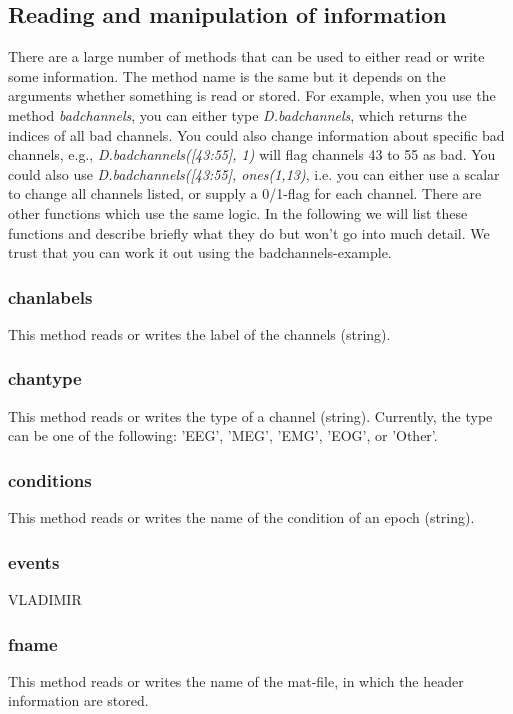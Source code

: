 \subsection{Reading and manipulation of information}
There are a large number of methods that can be used to either read or
write some information. The method name is the same but it depends on
the arguments whether something is read or stored. For example, when
you use the method \textit{badchannels}, you can either type
\textit{D.badchannels}, which returns the indices of all bad channels. You
could also change information about specific bad channels, e.g.,
\textit{D.badchannels([43:55], 1)} will flag channels 43 to 55 as
bad. You 
  could also use \textit{D.badchannels([43:55], ones(1,13)}, i.e. you
  can 
  either use a scalar to change all channels listed, or supply a
  0/1-flag for each channel. There are other functions which use the
  same logic. In the following we will list these functions and
  describe briefly what they do but won't go into much detail. We
  trust that you can work it out using the badchannels-example. 

\subsubsection{chanlabels}
This method reads or writes the label of the channels (string). 

\subsubsection{chantype}
This method reads or writes the type of a channel (string). Currently,
the type can be one of the following: 'EEG', 'MEG', 'EMG', 'EOG', or
'Other'.

\subsubsection{conditions}
This method  reads or writes the name of the condition of an epoch
(string). 


\subsubsection{events}
VLADIMIR

\subsubsection{fname}
This method reads or writes the name of the mat-file, in which the
header information are stored. 

